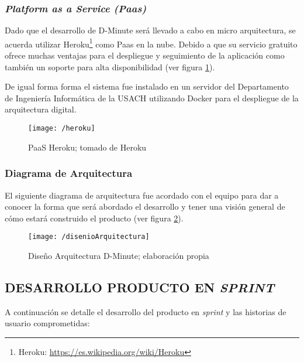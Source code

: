 \subsubsection{\textit{Platform as a Service (Paas)}}

Dado que el desarrollo de D-Minute será llevado a cabo en micro arquitectura, se acuerda utilizar Heroku\footnote{Heroku: \url{https://es.wikipedia.org/wiki/Heroku}} como Paas en la nube. Debido a que su servicio gratuito ofrece muchas ventajas para el despliegue y seguimiento de la aplicación como también un soporte para alta disponibilidad (ver figura \ref{img4-14}).

De igual forma forma el sistema fue instalado en un servidor del Departamento de Ingeniería Informática de la USACH utilizando Docker para el despliegue de la arquitectura digital.

\begin{figure}[!h]
\centering
\texttt{[image: /heroku]}
\caption{PaaS Heroku; tomado de Heroku} 
\label{img4-14}
\end{figure}

\subsubsection{Diagrama de Arquitectura}

El siguiente diagrama de arquitectura fue acordado con el equipo para dar a conocer la forma que será abordado el desarrollo y tener una visión general de cómo estará construido el producto (ver figura \ref{img4-15}).

\begin{figure}[!h]
\centering
\texttt{[image: /disenioArquitectura]}
\caption{Dise\~no Arquitectura D-Minute; elaboración propia} 
\label{img4-15}
\end{figure}

\subsection{DESARROLLO PRODUCTO EN \textit{SPRINT}}

A continuación se detalle el desarrollo del producto en \textit{sprint} y las historias de usuario comprometidas:

